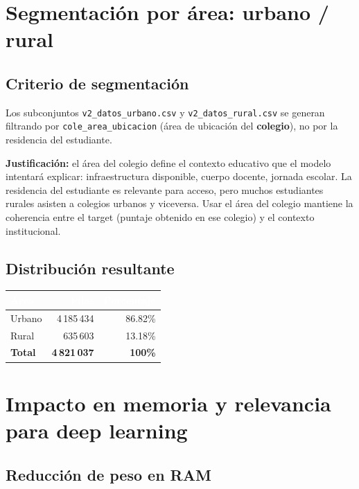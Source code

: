 \documentclass[12pt, a4paper]{article}
\newcommand{\thead}[1]{\cellcolor{tabheader}\textcolor{white}{\textbf{#1}}}
\begin{document}
\section{Segmentación por área: urbano / rural}

\subsection{Criterio de segmentación}

Los subconjuntos \texttt{v2\_datos\_urbano.csv} y \texttt{v2\_datos\_rural.csv}
se generan filtrando por \texttt{cole\_area\_ubicacion} (área de ubicación del
\textbf{colegio}), no por la residencia del estudiante.

\textbf{Justificación:} el área del colegio define el contexto educativo que el
modelo intentará explicar: infraestructura disponible, cuerpo docente, jornada
escolar. La residencia del estudiante es relevante para acceso, pero muchos
estudiantes rurales asisten a colegios urbanos y viceversa. Usar el área del
colegio mantiene la coherencia entre el target (puntaje obtenido en ese colegio)
y el contexto institucional.

\subsection{Distribución resultante}

\vspace{4pt}
\begin{tabular}{lrr}
  \toprule
  \thead{Área} & \thead{Filas} & \thead{Porcentaje} \\
  \midrule
  \rowcolor{rowalt}
  Urbano         & 4\,185\,434 & 86.82\% \\
  Rural          &   635\,603  & 13.18\% \\
  \midrule
  \textbf{Total} & \textbf{4\,821\,037} & \textbf{100\%} \\
  \bottomrule
\end{tabular}

\section{Impacto en memoria y relevancia para deep learning}

\subsection{Reducción de peso en RAM}
\end{document}
